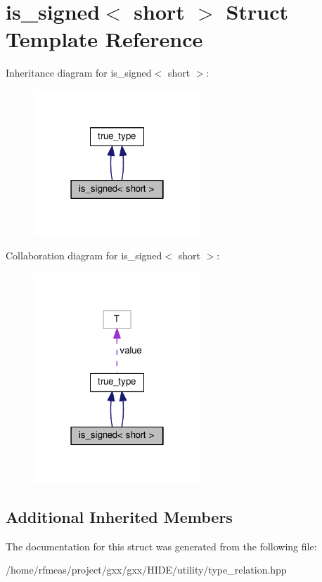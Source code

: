 \hypertarget{structis__signed_3_01short_01_4}{}\section{is\+\_\+signed$<$ short $>$ Struct Template Reference}
\label{structis__signed_3_01short_01_4}


Inheritance diagram for is\+\_\+signed$<$ short $>$\+:
\nopagebreak
\begin{figure}[H]
\begin{center}
\leavevmode
\includegraphics[width=178pt]{structis__signed_3_01short_01_4__inherit__graph}
\end{center}
\end{figure}


Collaboration diagram for is\+\_\+signed$<$ short $>$\+:
\nopagebreak
\begin{figure}[H]
\begin{center}
\leavevmode
\includegraphics[width=178pt]{structis__signed_3_01short_01_4__coll__graph}
\end{center}
\end{figure}
\subsection*{Additional Inherited Members}


The documentation for this struct was generated from the following file\+:\begin{DoxyCompactItemize}
\item 
/home/rfmeas/project/gxx/gxx/\+H\+I\+D\+E/utility/type\+\_\+relation.\+hpp\end{DoxyCompactItemize}
